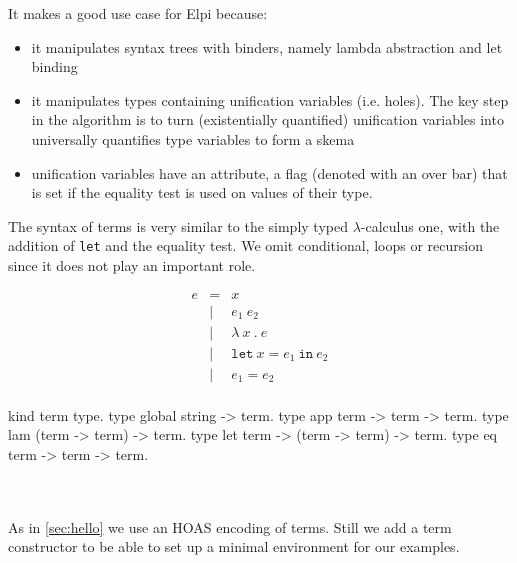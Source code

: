 \documentclass[a4paper, 11pt]{book}
\begin{document}
It makes a good use case for Elpi because:
\begin{itemize}
  \item it manipulates syntax trees with binders, namely lambda abstraction
    and let binding
  \item it manipulates types containing unification variables (i.e. holes).
    The key step in the algorithm is to turn (existentially quantified)
    unification variables into universally quantifies type variables to
    form a skema
  \item unification variables have an attribute, a flag (denoted with
    an over bar) that is set if the equality test is used on values
    of their type.
\end{itemize}

The syntax of terms is very similar to the simply typed $\lambda$-calculus
one, with the addition of \texttt{let} and the equality test. We omit
conditional, loops or recursion since it does not play an important role.

\begin{center}
\begin{minipage}{0.35\textwidth}
$$
\begin{array}{lrl}
  e & =     & x                                 \\
  & \vert & e_1\ e_2                            \\
  & \vert & \lambda\ x\ .\ e                    \\
  & \vert & \mathtt{let}\ x = e_1\ \mathtt{in}\ e_2 \\
  & \vert & e_1 = e_2 \\
\end{array}
$$
\end{minipage}
\begin{minipage}{0.60\textwidth}
\vspace{0.5em}
\begin{elpicodelj}
kind term   type.
type global string -> term.
type app    term -> term -> term.
type lam    (term -> term) -> term.
type let    term -> (term -> term) -> term.
type eq     term -> term -> term.
\end{elpicodelj}
\end{minipage}
\end{center}
~\\  
~\\  
As in \cref{sec:hello} we use an HOAS encoding of terms.
Still we add a  term constructor to
be able to set up a minimal environment for our examples.
\end{document}
